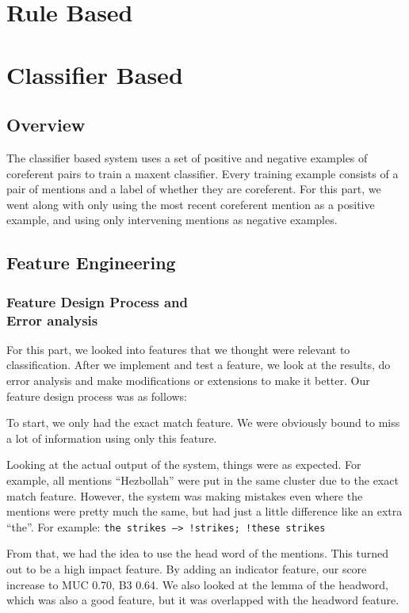 \documentclass[12pt, twocolumn]{article}
\begin{document}
\section{Rule Based}

\section{Classifier Based}
\subsection{Overview}
The classifier based system uses a set of positive and negative examples of coreferent pairs to train a maxent classifier. Every training example consists of a pair of mentions and a label of whether they are coreferent. For this part, we went along with only using the most recent coreferent mention as a positive example, and using only intervening mentions as negative examples. 
\subsection{Feature Engineering}
\subsubsection{Feature Design Process and\\ Error analysis}
For this part, we looked into features that we thought were relevant to classification. After we implement and test a feature, we look at the results, do error analysis and make modifications or extensions to make it better. Our feature design process was as follows:

To start, we only had the exact match feature. We were obviously bound to miss a lot of information using only this feature. 

Looking at the actual output of the system, things were as expected. For example, all mentions ``Hezbollah'' were put in the same cluster due to the exact match feature. However, the system was making mistakes even where the mentions were pretty much the same, but had just a little difference like an extra ``the''. For example: \texttt{{the strikes} -->  !{strikes}; !{these strikes}}

From that, we had the idea to use the head word of the mentions. This turned out to be a high impact feature. By adding an indicator feature, our score increase to MUC 0.70, B3 0.64. We also looked at the lemma of the headword, which was also a good feature, but it was overlapped with the headword feature.
\end{document}

